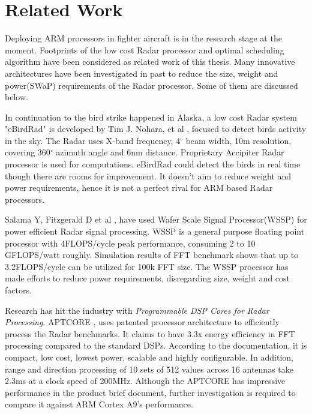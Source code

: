 \section{Related Work}
\label{sec:related_work}
Deploying ARM processors in fighter aircraft is in the research stage at the moment. Footprints of the low cost Radar processor and optimal scheduling algorithm have been considered as related work of this thesis. Many innovative architectures have been investigated in past to reduce the size, weight and power(SWaP) requirements of the Radar processor. Some of them are discussed below.

In continuation to the bird strike happened in Alaska, a low cost Radar system "eBirdRad" is developed by Tim J. Nohara, et al \cite{relWork1}, focused to detect birds activity in the sky. The Radar uses X-band frequency, 4$^{\circ}$ beam width, 10m resolution, covering 360$^{\circ}$  azimuth angle and 6nm distance. Proprietary Accipiter Radar processor is used for computations. eBirdRad could detect the birds in real time though there are rooms for improvement. It doesn't aim to reduce weight and power requirements, hence it is not a perfect rival for ARM based Radar processors. 

Salama Y, Fitzgerald D et al \cite{relWork3}, have used Wafer Scale Signal Processor(WSSP) for power efficient Radar signal processing. WSSP is a general purpose floating point processor with 4FLOPS/cycle peak performance, consuming 2 to 10 GFLOPS/watt roughly. Simulation results of FFT benchmark shows that up to 3.2FLOPS/cycle can be utilized for 100k FFT size. The WSSP processor has made efforts to reduce power requirements, disregarding size, weight and cost factors.

Research has hit the industry with \textsl{Programmable DSP Cores for Radar Processing}. APTCORE \cite{relWork4}, uses patented processor architecture to efficiently process the Radar benchmarks. It claims to have 3.3x energy efficiency in FFT processing compared to the standard DSPs. According to the documentation, it is compact, low cost, lowest power, scalable and highly configurable. In addition, range and direction processing of 10 sets of 512 values across 16 antennas take 2.3ms at a clock speed of 200MHz. Although the APTCORE has impressive performance in the product brief document, further investigation is required to compare it against ARM Cortex A9's performance.

